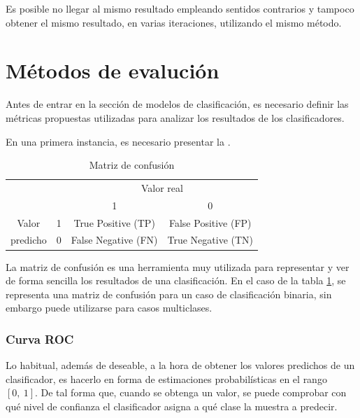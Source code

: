 Es posible no llegar al mismo resultado empleando sentidos contrarios y tampoco obtener el mismo resultado, en varias iteraciones, utilizando el mismo método.


\newpage
\section{Métodos de evalución}

Antes de entrar en la sección de modelos de clasificación, es necesario definir las métricas propuestas utilizadas para analizar los resultados de los clasificadores.

En una primera instancia, es necesario presentar la .

\begin{table}[h]
	\centering
	\caption{Matriz de confusión}
	\label{tab:matriz_confusion}
	\begin{tabular}{cc|cc|}
		\cline{3-4}
		&  & \multicolumn{2}{c|}{Valor real} \\ \cline{3-4} 
		&  & \multicolumn{1}{c|}{1}    & 0   \\ \hline
		\multicolumn{1}{|c|}{Valor}    & 1 & \multicolumn{1}{c|}{True Positive (TP)}  & False Positive (FP) \\ \cline{2-4} 
		\multicolumn{1}{|c|}{predicho} & 0 & \multicolumn{1}{c|}{False Negative (FN)} & True Negative (TN)  \\ \hline
	\end{tabular}
\end{table}

La matriz de confusión es una herramienta muy utilizada para representar y ver de forma sencilla los resultados de una clasificación. En el caso de la tabla \ref{tab:matriz_confusion}, se representa una matriz de confusión para un caso de clasificación binaria, sin embargo puede utilizarse para casos multiclases.


\subsubsection{Curva ROC}

Lo habitual, además de deseable, a la hora de obtener los valores predichos de un clasificador, es hacerlo en forma de estimaciones probabilísticas en el rango $[0,\:1]$. De tal forma que, cuando se obtenga un valor, se puede comprobar con qué nivel de confianza el clasificador asigna a qué clase la muestra a predecir.

